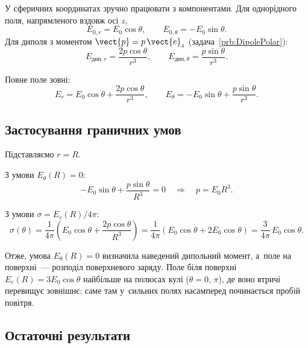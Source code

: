 У сферичних координатах зручно працювати з компонентами. Для
однорідного поля, напрямленого вздовж осі $z$,
\begin{equation*}
    E_{0,r} = E_0\cos\theta, \qquad
    E_{0,\theta} = -E_0\sin\theta .
\end{equation*}
Для диполя з моментом $\vect{p} = p\,\vect{e}_z$ (задача~\ref{prb:DipolePolar}):
\begin{equation*}
    E_{\text{дип},r} = \frac{2p\cos\theta}{r^3}, \qquad
    E_{\text{дип},\theta} = \frac{p\sin\theta}{r^3} .
\end{equation*}

Повне поле зовні:
\begin{equation*}
    E_r = E_0\cos\theta + \frac{2p\cos\theta}{r^3}, \qquad
    E_\theta = -E_0\sin\theta + \frac{p\sin\theta}{r^3} .
\end{equation*}

\subsection*{Застосування граничних умов}


Підставляємо $r = R$.

З умови $E_\theta(R) = 0$:
\begin{equation*}
    -E_0\sin\theta + \frac{p\sin\theta}{R^3} = 0
    \quad\Longrightarrow\quad
    p = E_0 R^3 .
\end{equation*}

З умови $\sigma = E_r(R)/4\pi$:
\begin{equation*}
    \sigma(\theta) = \frac{1}{4\pi}
    \left( E_0\cos\theta + \frac{2p\cos\theta}{R^3} \right)
    = \frac{1}{4\pi} \left( E_0\cos\theta
    + 2E_0\cos\theta \right)
    = \frac{3}{4\pi}\,E_0\cos\theta .
\end{equation*}

Отже, умова $E_\theta(R) = 0$ визначила наведений дипольний момент, а~поле на поверхні~---
розподіл поверхневого заряду. Поле біля поверхні $E_r(R) = 3E_0\cos\theta$ найбільше
на полюсах кулі ($\theta = 0,\,\pi$), де воно втричі перевищує зовнішнє: саме там у~сильних
полях насамперед починається пробій повітря.

\subsection*{Остаточні результати}


